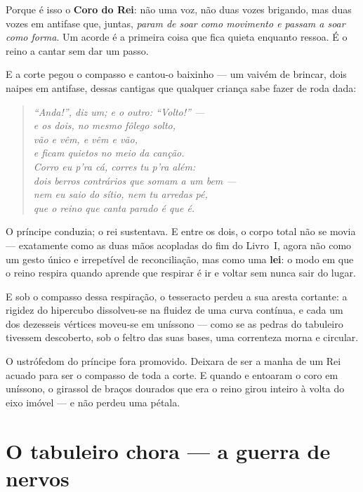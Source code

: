 \documentclass[livro.tex]{subfiles}
\begin{document}
\medskip

Porque é isso o \textbf{Coro do Rei}: não uma voz, não duas vozes brigando, mas duas
vozes em antifase que, juntas, \emph{param de soar como movimento e passam a soar
como forma}. Um acorde é a primeira coisa que fica quieta enquanto ressoa. É o
reino a cantar sem dar um passo.

\medskip

E a corte pegou o compasso e cantou-o baixinho --- um vaivém de brincar, dois naipes
em antifase, dessas cantigas que qualquer criança sabe fazer de roda dada:

\begin{verse}\itshape\small
``Anda!'', diz um; e o outro: ``Volto!'' ---\\
e os dois, no mesmo fôlego solto,\\
vão e vêm, e vêm e vão,\\
e ficam quietos no meio da canção.\\[3pt]
Corro eu p'ra cá, corres tu p'ra além:\\
dois berros contrários que somam a um bem ---\\
nem eu saio do sítio, nem tu arredas pé,\\
que o reino que canta parado é que é.
\end{verse}

O príncipe conduzia; o rei sustentava. E entre os dois, o corpo total não se movia
--- exatamente como as duas
mãos acopladas do fim do Livro~I, agora não como um gesto único e irrepetível de
reconciliação, mas como uma \textbf{lei}: o modo em que o reino respira quando
aprende que respirar é ir e voltar sem nunca sair do lugar.

\medskip

E sob o compasso dessa respiração, o tesseracto perdeu a sua aresta cortante: a rigidez
do hipercubo dissolveu-se na fluidez de uma curva contínua, e cada um dos dezesseis
vértices moveu-se em uníssono --- como se as pedras do tabuleiro tivessem descoberto, sob
o feltro das suas bases, uma correnteza morna e circular.

\medskip

O ustrófedom do príncipe fora promovido. Deixara de ser a manha de um Rei
acuado para ser o compasso de toda a corte. E quando \Joa e \Ben entoaram o
coro em uníssono, o girassol de braços dourados que era o reino girou inteiro à
volta do eixo imóvel --- e não perdeu uma pétala.

\chapter{O tabuleiro chora --- a guerra de nervos}
\end{document}
